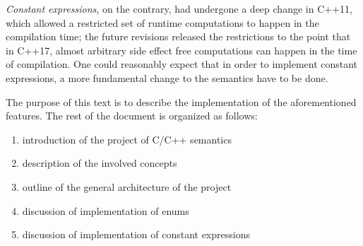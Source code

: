 \documentclass{fithesis3}
\begin{document}
\textit{Constant expressions}, on the contrary, had undergone a deep change in C++11, which allowed a restricted set of runtime computations to happen in the compilation time; the future revisions released the restrictions to the point that in C++17, almost arbitrary side effect free computations can happen in the time of compilation. One could reasonably expect that in order to implement constant expressions, a more fundamental change to the semantics have to be done.
 

The purpose of this text is to describe the implementation of the aforementioned features. The rest of the document is organized as follows:
\begin{enumerate}
\item introduction of the project of C/C++ semantics
\item description of the involved concepts
\item outline of the general architecture of the project
\item discussion of implementation of enums
\item discussion of implementation of constant expressions
\end{enumerate}





\end{document}
